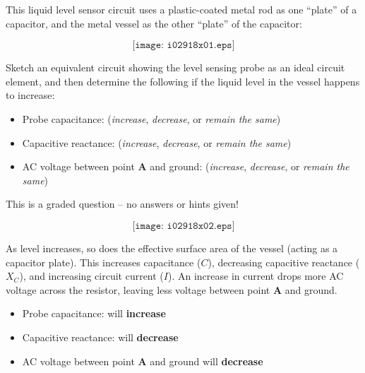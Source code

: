 

This liquid level sensor circuit uses a plastic-coated metal rod as one ``plate'' of a capacitor, and the metal vessel as the other ``plate'' of the capacitor:

$$\texttt{[image: i02918x01.eps]}$$

Sketch an equivalent circuit showing the level sensing probe as an ideal circuit element, and then determine the following if the liquid level in the vessel happens to increase:

\begin{itemize}
\item{} Probe capacitance: ({\it increase}, {\it decrease}, or {\it remain the same})
\vskip 10pt 
\item{} Capacitive reactance: ({\it increase}, {\it decrease}, or {\it remain the same})
\vskip 10pt 
\item{} AC voltage between point {\bf A} and ground: ({\it increase}, {\it decrease}, or {\it remain the same})
\end{itemize}

\vfil 

\eject






This is a graded question -- no answers or hints given!







$$\texttt{[image: i02918x02.eps]}$$

As level increases, so does the effective surface area of the vessel (acting as a capacitor plate).  This increases capacitance ($C$), decreasing capacitive reactance ($X_C$), and increasing circuit current ($I$).  An increase in current drops more AC voltage across the resistor, leaving less voltage between point {\bf A} and ground. 

\begin{itemize}
\item{} Probe capacitance: will {\bf increase}
\vskip 10pt 
\item{} Capacitive reactance: will {\bf decrease}
\vskip 10pt 
\item{} AC voltage between point {\bf A} and ground will {\bf decrease}
\end{itemize}


